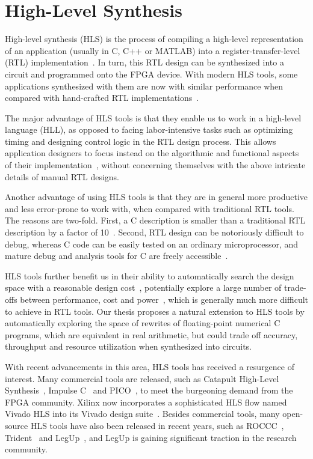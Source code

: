\section{High-Level Synthesis}
\label{bg:sec:high_level_synthesis}

High-level synthesis (HLS) is the process of compiling a high-level
representation of an application (usually in C, C++ or MATLAB) into a
register-transfer-level (RTL) implementation~\cite{coussy, gajski}.  In
turn, this RTL design can be synthesized into a circuit and programmed onto
the FPGA device.  With modern HLS tools, some applications synthesized with
them are now with similar performance when compared with hand-crafted RTL
implementations~\cite{bdti}.

The major advantage of HLS tools is that they enable us to work in a high-level
language (HLL), as opposed to facing labor-intensive tasks such as optimizing
timing and designing control logic in the RTL design process.  This allows
application designers to focus instead on the algorithmic and functional
aspects of their implementation~\cite{coussy}, without concerning themselves
with the above intricate details of manual RTL designs.

Another advantage of using HLS tools is that they are in general more
productive and less error-prone to work with, when compared with traditional
RTL tools.  The reasons are two-fold.  First, a C description is smaller than
a traditional RTL description by a factor of 10~\cite{coussy, bdti}.  Second,
RTL design can be notoriously difficult to debug, whereas C code can be easily
tested on an ordinary microprocessor, and mature debug and analysis tools for C
are freely accessible~\cite{canis13}.

HLS tools further benefit us in their ability to automatically search
the design space with a reasonable design cost~\cite{bdti}, potentially
explore a large number of trade-offs between performance, cost and
power~\cite{mcfarland}, which is generally much more difficult to achieve
in RTL tools.  Our thesis proposes a natural extension to HLS tools by
automatically exploring the space of rewrites of floating-point numerical
C programs, which are equivalent in real arithmetic, but could trade off
accuracy, throughput and resource utilization when synthesized into circuits.

With recent advancements in this area, HLS tools has received a resurgence
of interest. Many commercial tools are released, such as Catapult
High-Level Synthesis~\cite{catapultc}, Impulse C~\cite{impulsec} and
PICO~\cite{schreiber02}, to meet the burgeoning demand from the FPGA
community.  Xilinx now incorporates a sophisticated HLS flow named Vivado HLS
into its Vivado design suite~\cite{vivado_hls}.  Besides commercial tools,
many open-source HLS tools have also been released in recent years, such as
ROCCC~\cite{roccc}, Trident~\cite{tripp05} and LegUp~\cite{legup}, and LegUp is
gaining significant traction in the research community.


